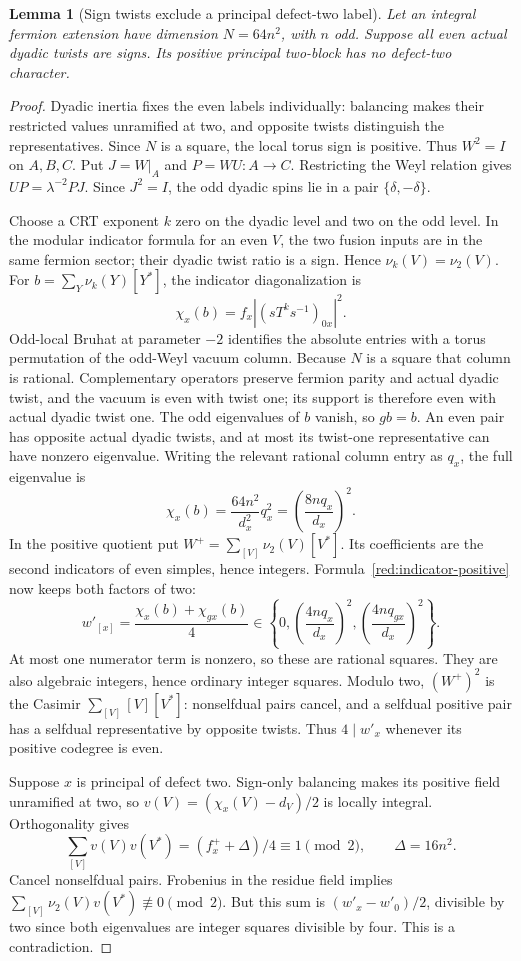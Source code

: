 \documentclass[11pt,a4paper]{article}
\numberwithin{equation}{section}
\newtheorem{lemma}[theorem]{Lemma}
\begin{document}
\begin{lemma}[Sign twists exclude a principal defect-two label]
\label{red:ef:sign-fs-square}
Let an integral fermion extension have dimension $N=64n^2$,
with $n$ odd. Suppose all even actual dyadic twists are signs.
Its positive principal two-block has no defect-two character.
\end{lemma}
\begin{proof}
Dyadic inertia fixes the even labels individually: balancing
makes their restricted values unramified at two, and opposite
twists distinguish the representatives. Since $N$ is a square,
the local torus sign is positive. Thus $W^2=I$ on $A,B,C$.
Put $J=W|_A$ and $P=WU:A\to C$. Restricting the Weyl relation
gives $UP=\lambda^{-2}PJ$. Since $J^2=I$, the odd dyadic
spins lie in a pair $\{\delta,-\delta\}$.

Choose a CRT exponent $k$ zero on the dyadic level and two
on the odd level. In the modular indicator formula for an even
$V$, the two fusion inputs are in the same fermion sector;
their dyadic twist ratio is a sign. Hence
$\nu_k(V)=\nu_2(V)$. For
$b=\sum_Y\nu_k(Y)[Y^*]$, the indicator diagonalization is
\[
                \chi_x(b)=f_x|(sT^ks^{-1})_{0x}|^2.
\]
Odd-local Bruhat at parameter $-2$ identifies the absolute
entries with a torus permutation of the odd-Weyl vacuum column.
Because $N$ is a square that column is rational. Complementary
operators preserve fermion parity and actual dyadic twist, and the
vacuum is even with twist one; its support is therefore even with
actual dyadic twist one. The
odd eigenvalues of $b$ vanish, so $gb=b$. An even pair has opposite
actual dyadic twists, and at most its twist-one representative can
have nonzero eigenvalue. Writing the relevant rational column entry
as $q_x$, the full eigenvalue is
\[
             \chi_x(b)=\frac{64n^2}{d_x^2}q_x^2
                         =\left(\frac{8nq_x}{d_x}\right)^2.
\]
In the positive quotient put
$W^+=\sum_{[V]}\nu_2(V)[V^*]$. Its coefficients are the second
indicators of even simples, hence integers. Formula~\eqref{red:indicator-positive}
now keeps both factors of two:
\[
 w'_{[x]}=\frac{\chi_x(b)+\chi_{gx}(b)}4
     \in\left\{0,\left(\frac{4nq_x}{d_x}\right)^2,
                    \left(\frac{4nq_{gx}}{d_x}\right)^2\right\}.
\]
At most one numerator term is nonzero, so these are rational squares.
They are also algebraic integers, hence ordinary integer squares. Modulo two, $(W^+)^2$ is the Casimir
$\sum_{[V]}[V][V^*]$: nonselfdual pairs cancel, and a selfdual
positive pair has a selfdual representative by opposite twists.
Thus $4\mid w'_x$ whenever its positive codegree is even.

Suppose $x$ is principal of defect two. Sign-only balancing
makes its positive field unramified at two, so
$v(V)=(\chi_x(V)-d_V)/2$ is locally integral. Orthogonality
gives
\[
 \sum_{[V]}v(V)v(V^*)=(f_x^++\Delta)/4\equiv1\pmod2,
 \qquad \Delta=16n^2.
\]
Cancel nonselfdual pairs. Frobenius in the residue field implies
$\sum_{[V]}\nu_2(V)v(V^*)\not\equiv0\pmod2$.
But this sum is $(w'_x-w'_0)/2$, divisible by two since both
eigenvalues are integer squares divisible by four. This is a
contradiction.
\end{proof}
\end{document}
